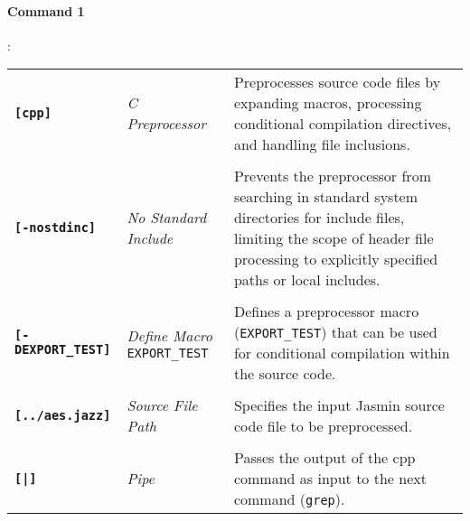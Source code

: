 \paragraph{Command 1}:
\begin{table}[h!]
\begin{tabularx}{\textwidth}{>{\raggedleft\arraybackslash}p{}>{\centering\arraybackslash}p{}p{}}
\textbf{\texttt{[cpp]}} & \textit{C Preprocessor}  &Preprocesses source code files by expanding macros, processing conditional compilation directives, and handling file inclusions. \\ \\
\textbf{\texttt{[-nostdinc]}} & \textit{No Standard Include} & Prevents the preprocessor from searching in standard system directories for include files, limiting the scope of header file processing to explicitly specified paths or local includes.
\\ \\
\textbf{\texttt{[-DEXPORT\_TEST]}} & \textit{Define Macro} \texttt{EXPORT\_TEST} & Defines a preprocessor macro (\texttt{EXPORT\_TEST}) that can be used for conditional compilation within the source code.\\ \\
\textbf{\texttt{[../aes.jazz]}} & \textit{Source File Path} & Specifies the input Jasmin source code file to be preprocessed. \\ \\
\textbf{\texttt{[|]}} & \textit{Pipe} & Passes the output of the cpp command as input to the next command (\texttt{grep}). \\
\end{tabularx}
\end{table}
